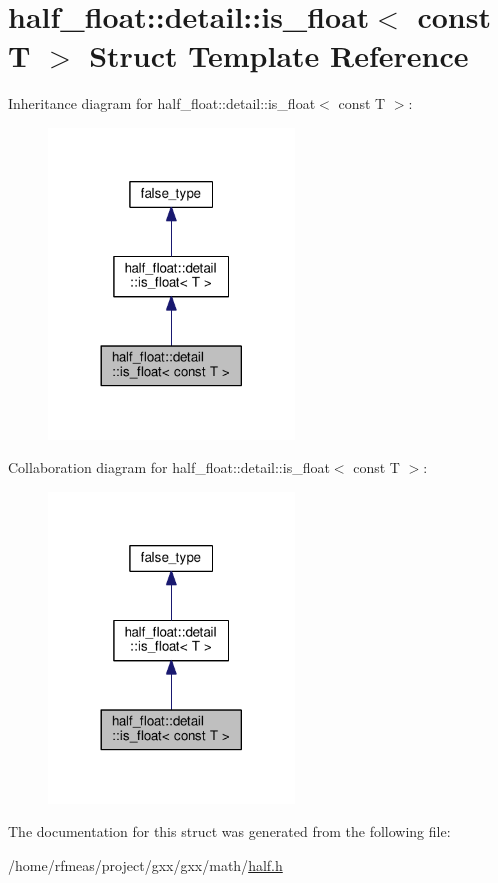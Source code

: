\hypertarget{structhalf__float_1_1detail_1_1is__float_3_01const_01T_01_4}{}\section{half\+\_\+float\+:\+:detail\+:\+:is\+\_\+float$<$ const T $>$ Struct Template Reference}
\label{structhalf__float_1_1detail_1_1is__float_3_01const_01T_01_4}


Inheritance diagram for half\+\_\+float\+:\+:detail\+:\+:is\+\_\+float$<$ const T $>$\+:
\nopagebreak
\begin{figure}[H]
\begin{center}
\leavevmode
\includegraphics[width=185pt]{structhalf__float_1_1detail_1_1is__float_3_01const_01T_01_4__inherit__graph}
\end{center}
\end{figure}


Collaboration diagram for half\+\_\+float\+:\+:detail\+:\+:is\+\_\+float$<$ const T $>$\+:
\nopagebreak
\begin{figure}[H]
\begin{center}
\leavevmode
\includegraphics[width=185pt]{structhalf__float_1_1detail_1_1is__float_3_01const_01T_01_4__coll__graph}
\end{center}
\end{figure}


The documentation for this struct was generated from the following file\+:\begin{DoxyCompactItemize}
\item 
/home/rfmeas/project/gxx/gxx/math/\hyperlink{half_8h}{half.\+h}\end{DoxyCompactItemize}
